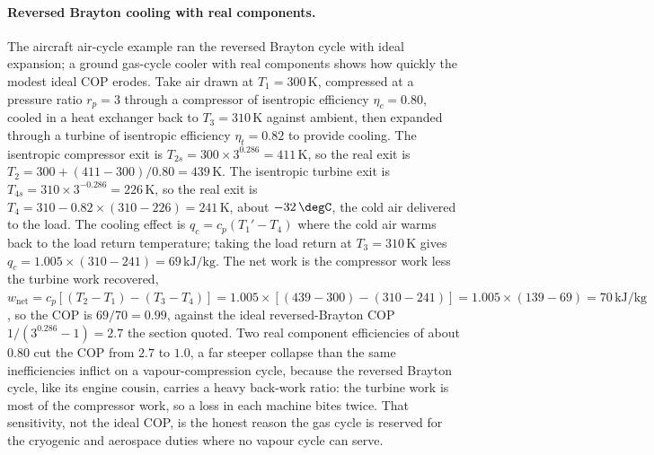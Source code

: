 \paragraph{Reversed Brayton cooling with real components.} The aircraft air-cycle
example ran the reversed Brayton cycle with ideal expansion; a ground gas-cycle
cooler with real components shows how quickly the modest ideal COP erodes. Take
air drawn at $T_1 = 300\,\si{\kelvin}$, compressed at a pressure ratio $r_p = 3$
through a compressor of isentropic efficiency $\eta_c = 0.80$, cooled in a heat
exchanger back to $T_3 = 310\,\si{\kelvin}$ against ambient, then expanded through
a turbine of isentropic efficiency $\eta_t = 0.82$ to provide cooling. The
isentropic compressor exit is $T_{2s} = 300 \times 3^{0.286} = 411\,\si{\kelvin}$,
so the real exit is $T_2 = 300 + (411 - 300)/0.80 = 439\,\si{\kelvin}$. The
isentropic turbine exit is $T_{4s} = 310 \times 3^{-0.286} = 226\,\si{\kelvin}$,
so the real exit is $T_4 = 310 - 0.82 \times (310 - 226) = 241\,\si{\kelvin}$,
about $-32\,\degC$, the cold air delivered to the load. The cooling effect is
$q_c = c_p(T_1' - T_4)$ where the cold air warms back to the load return
temperature; taking the load return at $T_3 = 310\,\si{\kelvin}$ gives $q_c =
1.005 \times (310 - 241) = 69\,\text{kJ}/\text{kg}$. The net work is the
compressor work less the turbine work recovered, $w_{\text{net}} = c_p[(T_2 - T_1)
- (T_3 - T_4)] = 1.005 \times [(439 - 300) - (310 - 241)] = 1.005 \times (139 -
69) = 70\,\text{kJ}/\text{kg}$, so the COP is $69/70 = 0.99$, against the ideal
reversed-Brayton COP $1/(3^{0.286} - 1) = 2.7$ the section quoted. Two real
component efficiencies of about $0.80$ cut the COP from $2.7$ to $1.0$, a far
steeper collapse than the same inefficiencies inflict on a vapour-compression
cycle, because the reversed Brayton cycle, like its engine cousin, carries a heavy
back-work ratio: the turbine work is most of the compressor work, so a loss in
each machine bites twice. That sensitivity, not the ideal COP, is the honest
reason the gas cycle is reserved for the cryogenic and aerospace duties where no
vapour cycle can serve.

